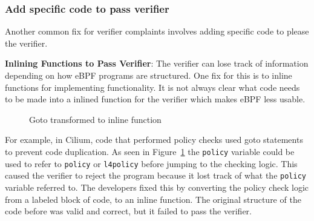 \subsubsection{Add specific code to pass verifier}
\label{motivation:add-code}
Another common fix for verifier complaints involves adding specific code to please
    the verifier.

%

\noindent\textbf{Inlining Functions to Pass Verifier}:
The verifier can lose track of information depending on how eBPF programs are structured.
One fix for this is to inline functions for implementing functionality.
It is not always clear what code needs to be made into a inlined function for the verifier
    which makes eBPF less usable.

\begin{figure}
    
    \caption{Goto transformed to inline function}
    \label{fig:inline-fig}
\end{figure}

%
%

For example, in Cilium, code that performed policy checks used goto statements to prevent code duplication.
As seen in Figure~\ref{fig:inline-fig} the \texttt{policy} variable could be used to refer to \texttt{policy} or \texttt{l4policy} before jumping to the checking logic.
This caused the verifier to reject the program because it lost track of what the \texttt{policy} variable referred to.
The developers fixed this by converting the policy check logic from a labeled block of code, to an inline function.
The original structure of the code before was valid and correct, but it failed to pass the verifier.


